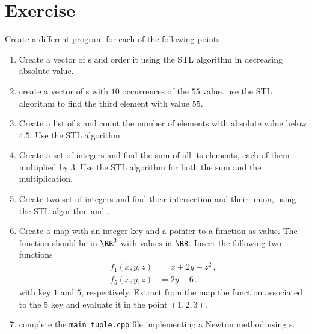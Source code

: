 \section*{Exercise}
Create a different program for each of the following points
\begin{enumerate}
    \item Create a vector of s and order it using the STL algorithm
     in decreasing absolute value.
    \item create a vector of s with $10$ occurrences of the $55$ value.
    use the STL algorithm  to find the third element with value $55$.
    \item Create a list of s and count the number of elements with
    absolute value below $4.5$. Use the STL algorithm .
    \item Create a set of integers and find the sum of all its elements, each
    of them multiplied by $3$. Use the STL algorithm  for both
    the sum and the multiplication.
    \item Create two set of integers and find their intersection and their
    union, using the STL algorithm  and .

    \item Create a map with an integer key and a pointer to a function as
    value. The function should be in $\RR^3$ with values in $\RR$. Insert the
    following two functions
    \begin{align*}
        f_1(x,y,z) &= x+2y-z^2\,,\\
        f_5(x,y,z) &= 2y-6\,.
    \end{align*}
    with key $1$ and $5$, respectively.
    Extract from the map the function associated to the $5$ key and evaluate it
    in the point $(1,2,3)$.
    \item complete the \texttt{main\_tuple.cpp} file implementing a Newton
    method using s.
\end{enumerate}
